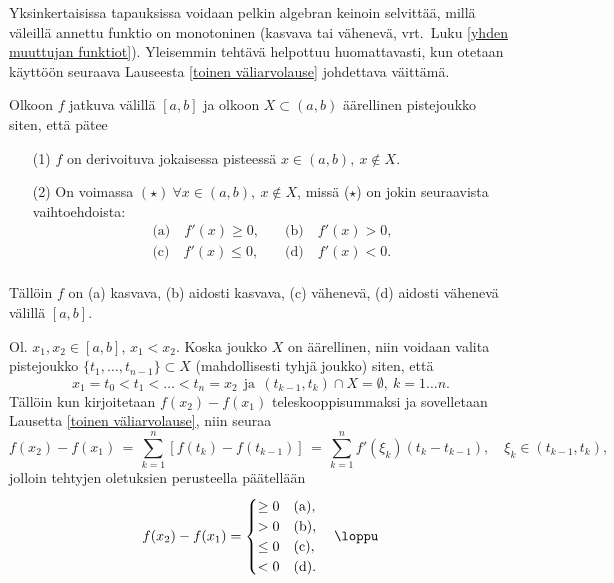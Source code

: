 Yksinkertaisissa tapauksissa voidaan pelkin algebran keinoin selvittää, millä väleillä annettu
funktio on monotoninen (kasvava tai vähenevä, vrt.\ Luku \ref{yhden muuttujan funktiot}).
Yleisemmin tehtävä helpottuu huomattavasti, kun otetaan käyttöön seuraava Lauseesta
\ref{toinen väliarvolause} johdettava väittämä.
\begin{Lause} \label{monotonisuuskriteeri}
Olkoon $f$ jatkuva välillä $[a,b]$ ja olkoon $X\subset (a,b)$ äärellinen pistejoukko siten,
että pätee
\begin{itemize}
\item[(1)] $f$ on derivoituva jokaisessa pisteessä $x\in (a,b),\ x \notin X$.
\item[(2)] On voimassa $(\star)\ \forall x\in (a,b),\ x\notin X$, missä ($\star$) on jokin 
           seuraavista vaihtoehdoista:
           \[
           \begin{array}{ll}
           \text{(a)}\quad f'(x)\geq 0, \quad &\text{(b)}\quad f'(x)>0, \\
           \text{(c)}\quad f'(x)\leq 0, \quad &\text{(d)}\quad f'(x)<0. \\ 
           \end{array}
           \]
\end{itemize}
Tällöin $f$ on (a) kasvava, (b) aidosti kasvava, (c) vähenevä, (d) aidosti vähenevä välillä 
$[a,b]$.
\end{Lause}
\tod Ol. $x_1,x_2\in [a,b]$, $x_1<x_2$. Koska joukko $X$ on äärellinen, niin voidaan valita 
pistejoukko $\{t_1,\ldots,t_{n-1}\}\subset X$ (mahdollisesti tyhjä joukko) siten, että
\[
x_1=t_0<t_1<\ldots <t_n=x_2\ \ \text{ja}\ \ (t_{k-1},t_k)\cap X=\emptyset, \ k=1\ldots n.
\]
Tällöin kun kirjoitetaan $f(x_2)-f(x_1)$ teleskooppisummaksi ja sovelletaan Lausetta
\ref{toinen väliarvolause}, niin seuraa
\[
f(x_2)-f(x_1) \,=\, \sum_{k=1}^n [f(t_k)-f(t_{k-1})]
              \,=\, \sum_{k=1}^n f'(\xi_k)(t_k-t_{k-1}), \quad \xi_k\in (t_{k-1},t_k),
\]
jolloin tehtyjen oletuksien perusteella päätellään
\[
f(x_2)-f(x_1)=\begin{cases}
\ge 0 &\text{(a)}, \\
> 0   &\text{(b)}, \\
\le 0 &\text{(c)}, \\
< 0   &\text{(d)}. \\
\end{cases} \quad\loppu
\]

